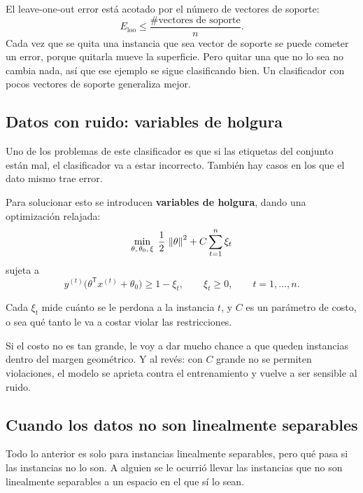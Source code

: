 \documentclass[11pt,letterpaper]{article}
\begin{document}
\begin{idea}
  El leave-one-out error está acotado por el número de vectores de
  soporte:
  \[
      E_{\mathrm{loo}} \leq \frac{\#\text{vectores de soporte}}{n} .
  \]
  Cada vez que se quita una instancia que sea vector de soporte se
  puede cometer un error, porque quitarla mueve la superficie. Pero
  quitar una que no lo sea no cambia nada, así que ese ejemplo se
  sigue clasificando bien. Un clasificador con pocos vectores de
  soporte generaliza mejor.
\end{idea}


\subsection*{Datos con ruido: variables de holgura}

Uno de los problemas de este clasificador es que si las etiquetas del
conjunto están mal, el clasificador va a estar incorrecto. También
hay casos en los que el dato mismo trae error.

Para solucionar esto se introducen \textbf{variables de holgura},
dando una optimización relajada:
\[
    \min_{\theta,\,\theta_0,\,\xi} \; \frac{1}{2}\,\left\lVert \theta \right\rVert^{2}
    + C \sum_{t=1}^{n} \xi_t
\]
sujeta a
\[
    y^{(t)} \big(\theta^{\mathsf{T}} x^{(t)} + \theta_0\big)
    \geq 1 - \xi_t ,
    \qquad \xi_t \geq 0 ,
    \qquad t = 1, \ldots, n .
\]

Cada $\xi_t$ mide cuánto se le perdona a la instancia $t$, y $C$ es
un parámetro de costo, o sea qué tanto le va a costar violar las
restricciones.

\begin{ojo}
  Si el costo no es tan grande, le voy a dar mucho chance a que
  queden instancias dentro del margen geométrico. Y al revés: con $C$
  grande no se permiten violaciones, el modelo se aprieta contra el
  entrenamiento y vuelve a ser sensible al ruido.
\end{ojo}


\subsection*{Cuando los datos no son linealmente separables}

Todo lo anterior es solo para instancias linealmente separables, pero
qué pasa si las instancias no lo son. A alguien se le ocurrió llevar
las instancias que no son linealmente separables a un espacio en el
que sí lo sean.
\end{document}
